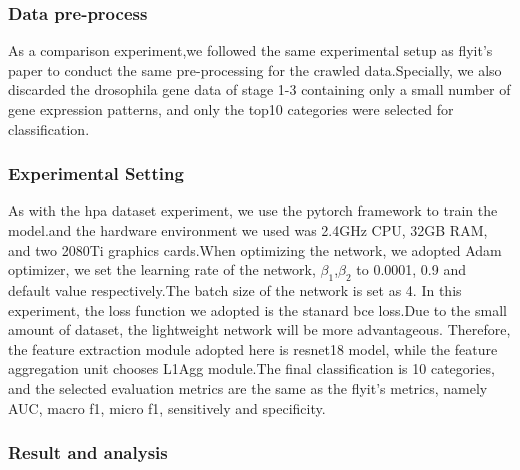 \documentclass[10pt,twocolumn,letterpaper]{article}
\begin{document}
\subsubsection{Data pre-process}
As a comparison experiment,we followed the same experimental setup as flyit's\cite{ref27} paper to conduct the same pre-processing for the crawled data.Specially, we also discarded the drosophila gene data of stage 1-3 containing only a small number of gene expression patterns, and only the top10 categories were selected for classification.

\subsubsection{Experimental Setting}
As with the hpa dataset experiment, we use the pytorch framework to train the model.and the hardware environment we used was 2.4GHz CPU, 32GB RAM, and two 2080Ti graphics cards.When optimizing the network, we adopted Adam optimizer\cite{ref25}, we set the learning rate of the network, $\beta_1$,$\beta_2$ to 0.0001, 0.9 and default value respectively.The batch size of the network is set as 4. In this experiment, the loss function we adopted is the stanard bce loss.Due to the small amount of dataset, the lightweight network will be more advantageous. Therefore, the feature extraction module adopted here is resnet18 model, while the feature aggregation unit chooses L1Agg module.The final classification is 10 categories, and the selected evaluation metrics are the same as the flyit's\cite{ref27} metrics, namely AUC, macro f1, micro f1, sensitively and specificity.

\subsubsection{Result and analysis}
\end{document}
